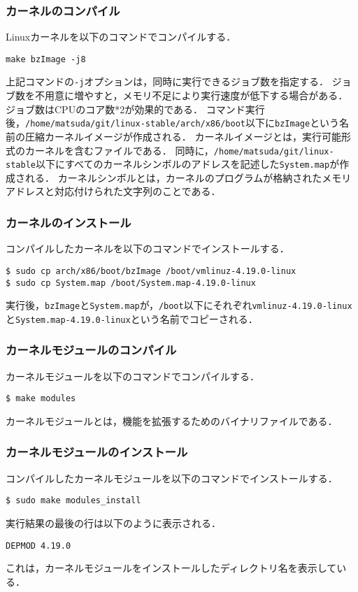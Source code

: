 \documentclass[12pt]{jsarticle}
\begin{document}
\subsubsection{カーネルのコンパイル}
Linuxカーネルを以下のコマンドでコンパイルする．
\begin{verbatim}
make bzImage -j8
\end{verbatim}
上記コマンドの\verb|-j|オプションは，同時に実行できるジョブ数を指定する．
ジョブ数を不用意に増やすと，メモリ不足により実行速度が低下する場合がある．
ジョブ数はCPUのコア数*2が効果的である．
コマンド実行後，\verb|/home/matsuda/git/linux-stable/arch/x86/boot|以下に\verb|bzImage|という名前の圧縮カーネルイメージが作成される．
カーネルイメージとは，実行可能形式のカーネルを含むファイルである．
同時に，\verb|/home/matsuda/git/linux-stable|以下にすべてのカーネルシンボルのアドレスを記述した\verb|System.map|が作成される．
カーネルシンボルとは，カーネルのプログラムが格納されたメモリアドレスと対応付けられた文字列のことである．

\subsubsection{カーネルのインストール}
コンパイルしたカーネルを以下のコマンドでインストールする．
\begin{verbatim}
$ sudo cp arch/x86/boot/bzImage /boot/vmlinuz-4.19.0-linux
$ sudo cp System.map /boot/System.map-4.19.0-linux
\end{verbatim}
実行後，\verb|bzImage|と\verb|System.map|が，\verb|/boot|以下にそれぞれ\verb|vmlinuz-4.19.0-linux|と\verb|System.map-4.19.0-linux|という名前でコピーされる．

\subsubsection{カーネルモジュールのコンパイル}
カーネルモジュールを以下のコマンドでコンパイルする．
\begin{verbatim}
$ make modules
\end{verbatim}
カーネルモジュールとは，機能を拡張するためのバイナリファイルである．

\subsubsection{カーネルモジュールのインストール}
コンパイルしたカーネルモジュールを以下のコマンドでインストールする．
\begin{verbatim}
$ sudo make modules_install
\end{verbatim}
実行結果の最後の行は以下のように表示される．
\begin{verbatim}
DEPMOD 4.19.0
\end{verbatim}
これは，カーネルモジュールをインストールしたディレクトリ名を表示している．
\end{document}

